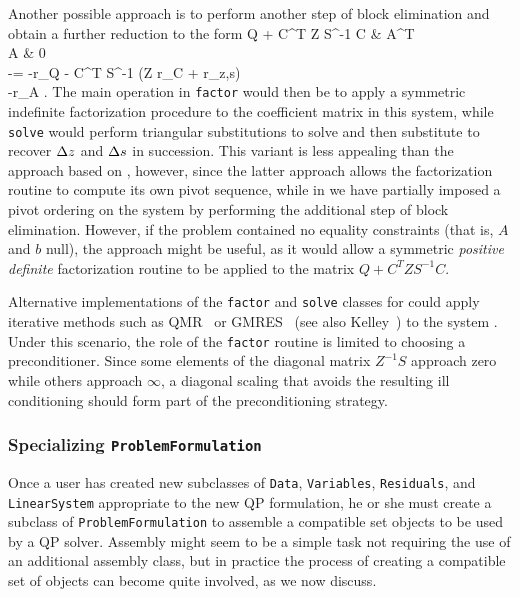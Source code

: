 Another possible approach is to perform another step of block
elimination and obtain a further reduction to the form
\beq \label{lin.equiv.compact}
 Q + C^T Z S^{-1} C & A^T \\ A & 0 \emat
{} \Dx \\ -\Dy \emat =
 -r_Q - C^T S^{-1} (Z r_C + r_{z,s}) \\ -r_A \emat.
\eeq
%
The main operation in {\tt factor} would then be to apply a symmetric
indefinite factorization procedure to the coefficient matrix in this
system, while {\tt solve} would perform triangular substitutions to
solve  and then substitute to recover $\Delta z$
and $\Delta s$ in succession. This variant is less appealing than the
approach based on , however, since the latter
approach allows the factorization routine to compute its own pivot
sequence, while in  we have partially imposed
a pivot ordering on the system by performing the additional step of
block elimination. However, if the problem  contained no
equality constraints (that is, $A$ and $b$ null), the approach
 might be useful, as it would allow a symmetric
{\em positive definite} factorization routine to be applied to the
matrix $Q + C^T Z S^{-1} C$.

Alternative implementations of the {\tt factor} and {\tt solve}
classes for  could apply iterative methods such as
QMR~\cite{Fre93,FreN91} or GMRES~\cite{Wal89} (see also
Kelley~\cite{ctk:roots}) to the system . Under this
scenario, the role of the {\tt factor} routine is limited to choosing
a preconditioner. Since some elements of the diagonal matrix $Z^{-1}
S$ approach zero while others approach $\infty$, a diagonal scaling
that avoids the resulting ill conditioning should form part of the
preconditioning strategy.

\subsubsection{Specializing \texttt{ProblemFormulation}}
\label{specializing-problem-formulation}

Once a user has created new subclasses of \texttt{Data},
\texttt{Variables}, \texttt{Residuals}, and \texttt{LinearSystem}
appropriate to the new QP formulation, he or she must create a
subclass of \texttt{ProblemFormulation} to assemble a compatible set
objects to be used by a QP solver.  Assembly might seem to be a simple
task not requiring the use of an additional assembly class, but in
practice the process of creating a compatible set of objects can
become quite involved, as we now discuss.

